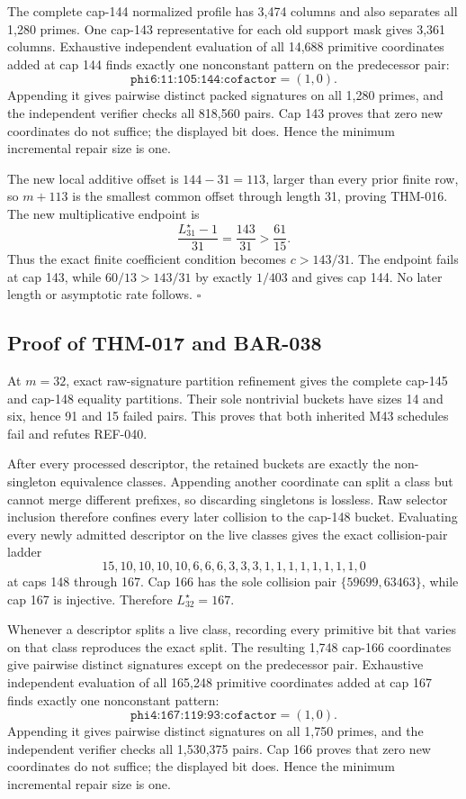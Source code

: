 \documentclass[11pt]{article}
\begin{document}
The complete cap-144 normalized profile has 3,474 columns and also separates
all 1,280 primes. One cap-143 representative for each old support mask gives
3,361 columns. Exhaustive independent evaluation of all 14,688 primitive
coordinates added at cap 144 finds exactly one nonconstant pattern on the
predecessor pair:
\[
\texttt{phi6:11:105:144:cofactor}=(1,0).
\]
Appending it gives pairwise distinct packed signatures on all 1,280 primes,
and the independent verifier checks all 818,560 pairs. Cap 143 proves that
zero new coordinates do not suffice; the displayed bit does. Hence the
minimum incremental repair size is one.

The new local additive offset is \(144-31=113\), larger than every prior
finite row, so \(m+113\) is the smallest common offset through length 31,
proving THM-016. The new multiplicative endpoint is
\[
\frac{L_{31}^{\star}-1}{31}=\frac{143}{31}
 > \frac{61}{15}.
\]
Thus the exact finite coefficient condition becomes \(c>143/31\). The
endpoint fails at cap 143, while \(60/13>143/31\) by exactly \(1/403\) and
gives cap 144. No later length or asymptotic rate follows. \(\square\)

\subsection{Proof of THM-017 and BAR-038}
\label{proof:THM-017-BAR-038}

At \(m=32\), exact raw-signature partition refinement gives the complete
cap-145 and cap-148 equality partitions. Their sole nontrivial buckets have
sizes 14 and six, hence 91 and 15 failed pairs. This proves that both
inherited M43 schedules fail and refutes REF-040.

After every processed descriptor, the retained buckets are exactly the
non-singleton equivalence classes. Appending another coordinate can split a
class but cannot merge different prefixes, so discarding singletons is
lossless. Raw selector inclusion therefore confines every later collision to
the cap-148 bucket. Evaluating every newly admitted descriptor on the live
classes gives the exact collision-pair ladder
\[
15,10,10,10,10,6,6,6,3,3,3,1,1,1,1,1,1,1,1,0
\]
at caps 148 through 167. Cap 166 has the sole collision pair
\(\{59699,63463\}\), while cap 167 is injective. Therefore
\(L_{32}^{\star}=167\).

Whenever a descriptor splits a live class, recording every primitive bit
that varies on that class reproduces the exact split. The resulting 1,748
cap-166 coordinates give pairwise distinct signatures except on the
predecessor pair. Exhaustive independent evaluation of all 165,248 primitive
coordinates added at cap 167 finds exactly one nonconstant pattern:
\[
\texttt{phi4:167:119:93:cofactor}=(1,0).
\]
Appending it gives pairwise distinct signatures on all 1,750 primes, and the
independent verifier checks all 1,530,375 pairs. Cap 166 proves that zero new
coordinates do not suffice; the displayed bit does. Hence the minimum
incremental repair size is one.
\end{document}
